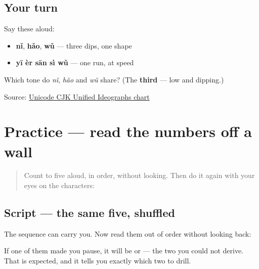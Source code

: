 \subsection*{Your turn}
Say these aloud:

\begin{itemize}
\raggedright
  \item \textbf{nǐ}, \textbf{hǎo}, \textbf{wǔ} — three dips, one shape
  \item \textbf{yī èr sān sì wǔ} — one run, at speed
\end{itemize}

\begin{tcolorbox}[breakable,colback=teal!4,colframe=teal!35!black,title={Before you move on}]
Which tone do \emph{nǐ}, \emph{hǎo} and \emph{wǔ} share? (The \textbf{third} — low and dipping.)

Source: \href{https://www.unicode.org/charts/PDF/U4E00.pdf}{Unicode CJK Unified Ideographs chart}
\end{tcolorbox}
\section[Practice]{Practice — read the numbers off a wall}

\label{lesson:ZH-C03-practice}



\begin{quote}
Count to five aloud, in order, without looking. Then do it again with your eyes on the characters:

\begin{quote}
    
\end{quote}
\end{quote}

\subsection*{Script — the same five, shuffled}
The sequence can carry you. Now read them out of order without looking back:

\begin{quote}
    
\end{quote}

\begin{quote}
    
\end{quote}

If one of them made you pause, it will be  or  — the two you could not derive. That is expected, and it tells you exactly which two to drill.

